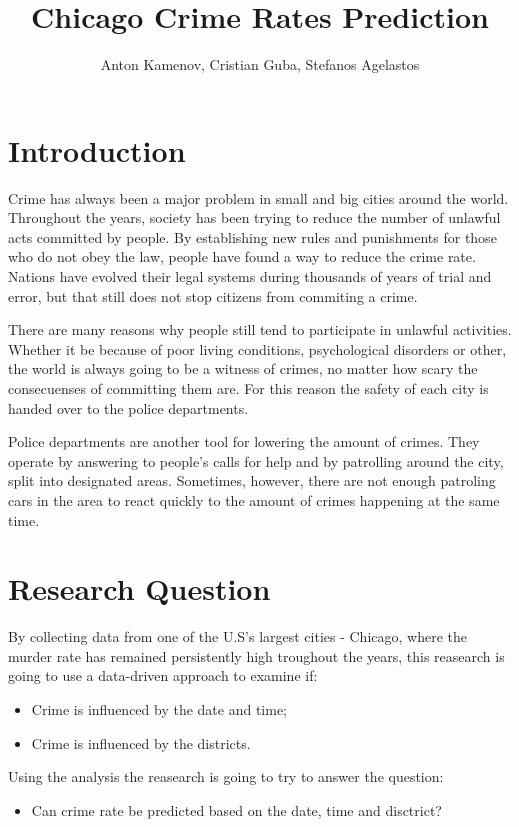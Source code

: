 \documentclass[a4paper, twocolumn]{article}
\author{Anton Kamenov, Cristian Guba, Stefanos Agelastos}
\title{Chicago Crime Rates Prediction}
\begin{document}
\onecolumn

\tableofcontents

\newpage

\listoffigures

\newpage
\twocolumn

\section{Introduction\label{sec:Introduction}}

Crime has always been a major problem in small and big cities around the world.
Throughout the years, society has been trying to reduce the number of unlawful acts committed by people.
By establishing new rules and punishments for those who do not obey the law, people have found a way to reduce the crime rate.
Nations have evolved their legal systems during thousands of years of trial and error, but that still does not stop citizens from commiting a crime.

There are many reasons why people still tend to participate in unlawful activities. 
Whether it be because of poor living conditions, psychological disorders or other, the world is always going to be a witness of crimes, no matter how scary the consecuenses of committing them are.
For this reason the safety of each city is handed over to the police departments.

Police departments are another tool for lowering the amount of crimes.
They operate by answering to people's calls for help and by patrolling around the city, split into designated areas.
Sometimes, however, there are not enough patroling cars in the area to react quickly to the amount of crimes happening at the same time.

\section{Research Question}
By collecting data from one of the U.S's largest cities - Chicago,
where the murder rate has remained persistently high troughout the years\cite{friedman2017crime},
this reasearch is going to use a data-driven approach to examine if:
\begin{itemize}
    \item Crime is influenced by the date and time;
    \item Crime is influenced by the districts.
\end{itemize}
Using the analysis the reasearch is going to try to answer the question:
\begin{itemize}
    \item Can crime rate be predicted based on the date, time and disctrict?
\end{itemize}
\end{document}
